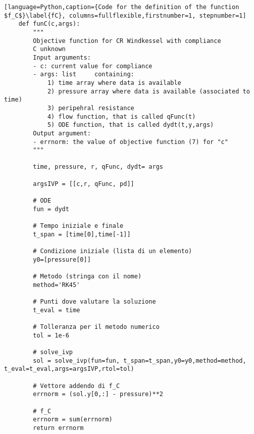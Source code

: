 \begin{lstlisting}[language=Python,caption={Code for the definition of the function $f_C$}\label{fC}, columns=fullflexible,firstnumber=1, stepnumber=1]
    def funC(c,args):
        """
        Objective function for CR Windkessel with compliance
        C unknown
        Input arguments:
        - c: current value for compliance
        - args: list     containing:
            1) time array where data is available
            2) pressure array where data is available (associated to time)
            3) peripehral resistance
            4) flow function, that is called qFunc(t)
            5) ODE function, that is called dydt(t,y,args)
        Output argument:
        - errnorm: the value of objective function (7) for "c"
        """
    
        time, pressure, r, qFunc, dydt= args
    
        argsIVP = [[c,r, qFunc, pd]]
    
        # ODE
        fun = dydt
    
        # Tempo iniziale e finale
        t_span = [time[0],time[-1]]
    
        # Condizione iniziale (lista di un elemento)
        y0=[pressure[0]]
    
        # Metodo (stringa con il nome)
        method='RK45'
   
        # Punti dove valutare la soluzione
        t_eval = time

        # Tolleranza per il metodo numerico
        tol = 1e-6
    
        # solve_ivp
        sol = solve_ivp(fun=fun, t_span=t_span,y0=y0,method=method, t_eval=t_eval,args=argsIVP,rtol=tol)
    
        # Vettore addendo di f_C
        errnorm = (sol.y[0,:] - pressure)**2
    
        # f_C
        errnorm = sum(errnorm)
        return errnorm
\end{lstlisting}